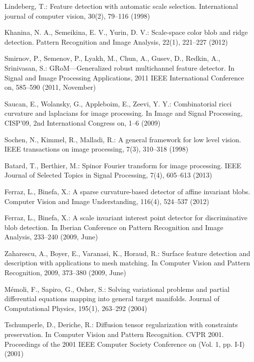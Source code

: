 \documentclass{llncs}
\begin{document}
\begin{thebibliography}{16}
%
Lindeberg, T.:
Feature detection with automatic scale selection. 
International journal of computer vision, 30(2), 79--116 (1998)

Khanina, N. A., Semeikina, E. V., Yurin, D. V.:
Scale-space color blob and ridge detection. 
Pattern Recognition and Image Analysis, 22(1), 221--227 (2012)

Smirnov, P., Semenov, P., Lyakh, M., Chun, A., Gusev, D., Redkin, A., Srinivasan, S.:
GRoM—Generalized robust multichannel feature detector. 
In Signal and Image Processing Applications, 2011 IEEE International Conference on, 585--590 (2011, November)

Saucan, E., Wolansky, G., Appleboim, E., Zeevi, Y. Y.:
Combinatorial ricci curvature and laplacians for image processing. 
In Image and Signal Processing, CISP'09, 2nd International Congress on, 1--6 (2009)

Sochen, N., Kimmel, R., Malladi, R.: 
A general framework for low level vision. 
IEEE transactions on image processing, 7(3), 310--318 (1998)

Batard, T., Berthier, M.:
Spinor Fourier transform for image processing. 
IEEE Journal of Selected Topics in Signal Processing, 7(4), 605--613 (2013)

Ferraz, L., Binefa, X.:
A sparse curvature-based detector of affine invariant blobs. 
Computer Vision and Image Understanding, 116(4), 524--537 (2012)

Ferraz, L., Binefa, X.:
A scale invariant interest point detector for discriminative blob detection. 
In Iberian Conference on Pattern Recognition and Image Analysis, 233--240  (2009, June)

Zaharescu, A., Boyer, E., Varanasi, K., Horaud, R.:
Surface feature detection and description with applications to mesh matching. 
In Computer Vision and Pattern Recognition, 2009, 373--380 (2009, June)

Mémoli, F., Sapiro, G., Osher, S.:
Solving variational problems and partial differential equations mapping into general target manifolds. 
Journal of Computational Physics, 195(1), 263--292 (2004)

Tschumperle, D., Deriche, R.:
Diffusion tensor regularization with constraints preservation. 
In Computer Vision and Pattern Recognition. CVPR 2001. Proceedings of the 2001 IEEE Computer Society Conference on (Vol. 1, pp. I-I) (2001)


\end{thebibliography}
\end{document}
